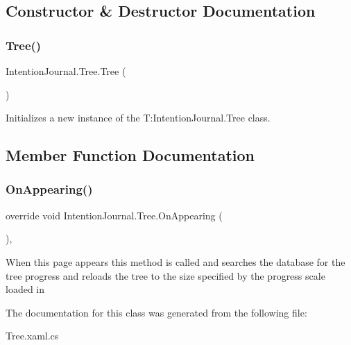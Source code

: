 \subsection{Constructor \& Destructor Documentation}
\mbox{\label{class_intention_journal_1_1_tree_ac27cc906417eb430c730500fddee785c}} 
\subsubsection{\texorpdfstring{Tree()}{Tree()}}
{\footnotesize\ttfamily Intention\+Journal.\+Tree.\+Tree (\begin{DoxyParamCaption}{ }\end{DoxyParamCaption})\hspace{0.3cm}{\ttfamily [inline]}}



Initializes a new instance of the T\+:\+Intention\+Journal.\+Tree class. 



\subsection{Member Function Documentation}
\mbox{\label{class_intention_journal_1_1_tree_a0d34416eb58cf86e6fe4e41193b58666}} 
\subsubsection{\texorpdfstring{On\+Appearing()}{OnAppearing()}}
{\footnotesize\ttfamily override void Intention\+Journal.\+Tree.\+On\+Appearing (\begin{DoxyParamCaption}{ }\end{DoxyParamCaption})\hspace{0.3cm}{\ttfamily [inline]}, {\ttfamily [protected]}}



When this page appears this method is called and searches the database for the tree progress and reloads the tree to the size specified by the progress scale loaded in 



The documentation for this class was generated from the following file\+:\begin{DoxyCompactItemize}
\item 
Tree.\+xaml.\+cs\end{DoxyCompactItemize}
